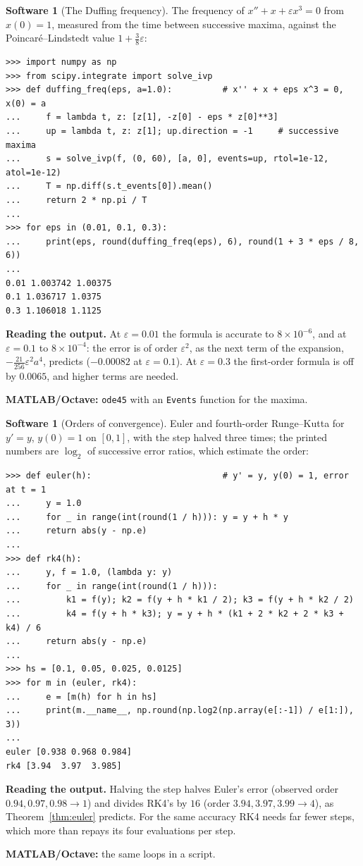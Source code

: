 \documentclass[11pt,a4paper]{article}
\numberwithin{equation}{section}
\theoremstyle{definition}
\newtheorem{software}[thm]{Software}
\begin{document}
\begin{software}[The Duffing frequency]
\label{sw:lindstedt}
The frequency of $x'' + x + \varepsilon x^3 = 0$ from $x(0) = 1$, measured from the time between successive maxima, against the Poincar\'e--Lindstedt value $1 + \frac38\varepsilon$:
{\small\begin{verbatim}
>>> import numpy as np
>>> from scipy.integrate import solve_ivp
>>> def duffing_freq(eps, a=1.0):          # x'' + x + eps x^3 = 0, x(0) = a
...     f = lambda t, z: [z[1], -z[0] - eps * z[0]**3]
...     up = lambda t, z: z[1]; up.direction = -1     # successive maxima
...     s = solve_ivp(f, (0, 60), [a, 0], events=up, rtol=1e-12, atol=1e-12)
...     T = np.diff(s.t_events[0]).mean()
...     return 2 * np.pi / T
...
>>> for eps in (0.01, 0.1, 0.3):
...     print(eps, round(duffing_freq(eps), 6), round(1 + 3 * eps / 8, 6))
...
0.01 1.003742 1.00375
0.1 1.036717 1.0375
0.3 1.106018 1.1125
\end{verbatim}}
\textbf{Reading the output.} At $\varepsilon = 0.01$ the formula is accurate to $8 \times 10^{-6}$, and at $\varepsilon = 0.1$ to $8 \times 10^{-4}$: the error is of order $\varepsilon^2$, as the next term of the expansion, $-\frac{21}{256}\varepsilon^2a^4$, predicts ($-0.00082$
at $\varepsilon = 0.1$). At $\varepsilon = 0.3$ the first-order formula is off by $0.0065$, and higher terms are needed.

\textbf{MATLAB/Octave:} \texttt{ode45} with an \texttt{Events} function for the maxima.
\end{software}

\begin{software}[Orders of convergence]
\label{sw:orders}
Euler and fourth-order Runge--Kutta for $y' = y$, $y(0) = 1$ on $[0, 1]$, with the step halved three times; the printed numbers are $\log_2$ of successive error ratios, which estimate the order:
{\small\begin{verbatim}
>>> def euler(h):                          # y' = y, y(0) = 1, error at t = 1
...     y = 1.0
...     for _ in range(int(round(1 / h))): y = y + h * y
...     return abs(y - np.e)
...
>>> def rk4(h):
...     y, f = 1.0, (lambda y: y)
...     for _ in range(int(round(1 / h))):
...         k1 = f(y); k2 = f(y + h * k1 / 2); k3 = f(y + h * k2 / 2)
...         k4 = f(y + h * k3); y = y + h * (k1 + 2 * k2 + 2 * k3 + k4) / 6
...     return abs(y - np.e)
...
>>> hs = [0.1, 0.05, 0.025, 0.0125]
>>> for m in (euler, rk4):
...     e = [m(h) for h in hs]
...     print(m.__name__, np.round(np.log2(np.array(e[:-1]) / e[1:]), 3))
...
euler [0.938 0.968 0.984]
rk4 [3.94  3.97  3.985]
\end{verbatim}}
\textbf{Reading the output.} Halving the step halves Euler's error (observed order $0.94, 0.97, 0.98 \to 1$) and divides RK4's by $16$ (order $3.94, 3.97, 3.99 \to 4$), as Theorem~\ref{thm:euler} predicts. For the same accuracy RK4 needs far fewer
steps, which more than repays its four evaluations per step.

\textbf{MATLAB/Octave:} the same loops in a script.
\end{software}
\end{document}
